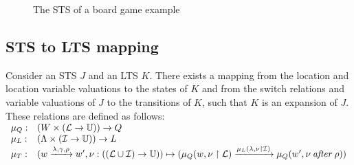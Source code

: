 \begin{figure}[ht]
  \begin{center}
    
  \end{center}
  \caption{The STS of a board game example}
  \label{fig:example_sts}
\end{figure}

\subsection{STS to LTS mapping}\label{sec:sts_lts_trafo}
Consider an STS $J$ and an LTS $K$. There exists a mapping from the location and location variable valuations to the states of $K$ and from the switch relations and variable valuations of $J$ to the transitions of $K$, such that $K$ is an expansion of $J$. These relations are defined as follows:
$\begin{array}{ll}
\mu_Q: & (W \times (\mathcal{L} \rightarrow \mathbb{U})) \rightarrow Q \\
\mu_L: & (\Lambda \times (\mathcal{I} \rightarrow \mathbb{U})) \rightarrow L \\
\mu_T: & (w\xrightarrow{\lambda,\gamma,\rho}w', \nu: ((\mathcal{L} \cup \mathcal{I}) \rightarrow \mathbb{U})) \mapsto (\mu_Q(w, \nu \restriction \mathcal{L}) \xrightarrow{\mu_L(\lambda, \nu \restriction\mathcal{I})} \mu_Q(w', \nu\:\mathit{after}\:\rho))
\end{array}$

\begin{comment}
These relations are constructed as follows: for a switch relation $r$ from location $A$ to location $B$, a valuation of the location variables $\nu_l$ and interaction variables $\nu_i$, $\mu_l:(A,\nu_l)$ maps to a state $q$, where $q$ is the source state of a transition $t$, if the result of the valuation $\nu:(\phi$ of $r, \nu_l \cup \nu_i)$ is true. $\nu_{l_new}$ is the new valuation of the location variables constructed by the valuation of $\rho$ of $r$. Then, the target state $q'$ of $t$ is the state mapped by $\mu_l:(B,\nu_{l_new}$). The label of $t$ is a textual representation of $\Gates$ of $r$ and $\nu_i$. Applying this rule for the topology to all locations, switch relations and concrete values for the variables, results in $L$. The start state $q0$ of $L$ is the state mapped by $\mu_l:(l_0,\initializationFunction)$. All states not reachable from $q0$ are removed from $L$.
\end{comment}

